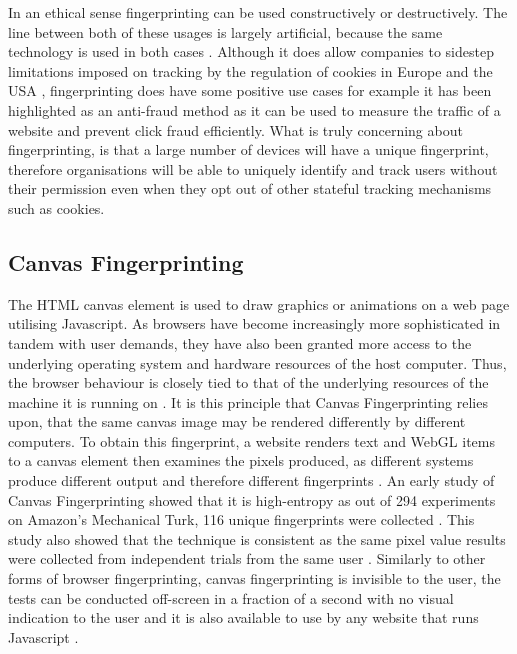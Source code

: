 \documentclass{article}
\begin{document}
In an ethical sense fingerprinting can be used constructively or destructively. The line between both of these usages is largely artificial, because the same technology is used in both cases \parencite{cookielessMonster}. Although it does allow companies to sidestep limitations imposed on tracking by the regulation of cookies in Europe and the USA \parencite{dustingFP}, fingerprinting does have some positive use cases for example it has been highlighted as an anti-fraud method as it can be used to measure the traffic of a website and prevent click fraud efficiently. What is truly concerning about fingerprinting, is that a large number of devices will have a unique fingerprint, therefore organisations will be able to uniquely identify and track users without their permission even when they opt out of other stateful tracking mechanisms such as cookies. 

\subsection{Canvas Fingerprinting}
The HTML canvas element is used to draw graphics or animations on a web page utilising Javascript. As browsers have become increasingly more sophisticated in tandem with user demands, they have also been granted more access to the underlying operating system and hardware resources of the host computer. Thus, the browser behaviour is closely tied to that of the underlying resources of the machine it is running on \parencite{canvasFP}. It is this principle that Canvas Fingerprinting relies upon, that the same canvas image may be rendered differently by different computers. To obtain this fingerprint, a website renders text and WebGL items to a canvas element then examines the pixels produced, as different systems produce different output and therefore different fingerprints \parencite{canvasFP}. An early study of Canvas Fingerprinting showed that it is high-entropy as out of 294 experiments on Amazon's Mechanical Turk, 116 unique fingerprints were collected \parencite{canvasFP}. This study also showed that the technique is consistent as the same pixel value results were collected from independent trials from the same user \parencite{canvasFP}. Similarly to other forms of browser fingerprinting, canvas fingerprinting is invisible to the user, the tests can be conducted off-screen in a fraction of a second with no visual indication to the user and it is also available to use by any website that runs Javascript \parencite{canvasFP}. \\
\end{document}
